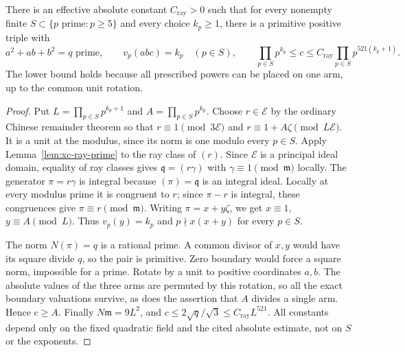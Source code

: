 \begin{theorem}
\label{thm:xc-prime-norm}
There is an effective absolute constant $C_{\mathrm{ray}}>0$ such that for every nonempty
finite $S\subset\{p\text{ prime}:p\ge5\}$ and every choice $k_p\ge1$,
there is a primitive positive triple with
\begin{equation}\label{eq:xc-ray-result}
 a^2+ab+b^2=q\text{ prime},\qquad
 v_p(abc)=k_p\quad(p\in S),\qquad
 \prod_{p\in S}p^{k_p}\le c
 \le C_{\mathrm{ray}}\prod_{p\in S}p^{521(k_p+1)}.
\end{equation}
The lower bound holds because all prescribed powers can be placed on one
arm, up to the common unit rotation.
\end{theorem}
\begin{proof}
Put $L=\prod_{p\in S}p^{k_p+1}$ and $A=\prod_{p\in S}p^{k_p}$.
Choose $r\in\mathcal E$ by the ordinary Chinese remainder theorem so that
$r\equiv1\pmod{3\mathcal E}$ and $r\equiv1+A\zeta\pmod{L\mathcal E}$.
It is a unit at the modulus, since its norm is one modulo every $p\in S$.
Apply Lemma~\ref{lem:xc-ray-prime} to the ray class of $(r)$.
Since $\mathcal E$ is a principal ideal domain, equality of ray classes gives
$\mathfrak q=(r\gamma)$ with $\gamma\equiv1\pmod{\mathfrak m}$ locally.
The generator $\pi=r\gamma$ is integral because $(\pi)=\mathfrak q$ is an
integral ideal. Locally at every modulus prime it is congruent to $r$;
since $\pi-r$ is integral, these congruences give $\pi\equiv r\pmod{\mathfrak m}$.
Writing $\pi=x+y\zeta$, we get $x\equiv1$, $y\equiv A\pmod L$.
Thus $v_p(y)=k_p$ and $p\nmid x(x+y)$ for every $p\in S$.

The norm $N(\pi)=q$ is a rational prime. A common divisor of $x,y$ would
have its square divide $q$, so the pair is primitive. Zero boundary would
force a square norm, impossible for a prime. Rotate by a unit to positive
coordinates $a,b$. The absolute values of the three arms are permuted by
this rotation, so all the exact boundary valuations survive, as does the
assertion that $A$ divides a single arm. Hence $c\ge A$.
Finally $N\mathfrak m=9L^2$, and
$c\le2\sqrt q/\sqrt3\le C_{\mathrm{ray}}L^{521}$.
All constants depend only on the fixed quadratic field and the cited
absolute estimate, not on $S$ or the exponents.
\end{proof}

